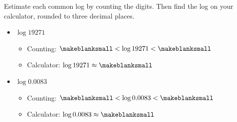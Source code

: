 \begin{Example}
Estimate each common log by counting the digits. Then find the log on your calculator, rounded to three decimal places.
\begin{itemize}
\item $\log 19271$
\begin{itemize}
\item Counting: $\makeblanksmall<\log 19271<\makeblanksmall$
\item Calculator: $\log 19271\approx\makeblanksmall$
\end{itemize}
\item $\log 0.0083$
\begin{itemize}
\item Counting: $\makeblanksmall<\log 0.0083<\makeblanksmall$
\item Calculator: $\log 0.0083\approx\makeblanksmall$
\end{itemize}
\end{itemize}
\end{Example}